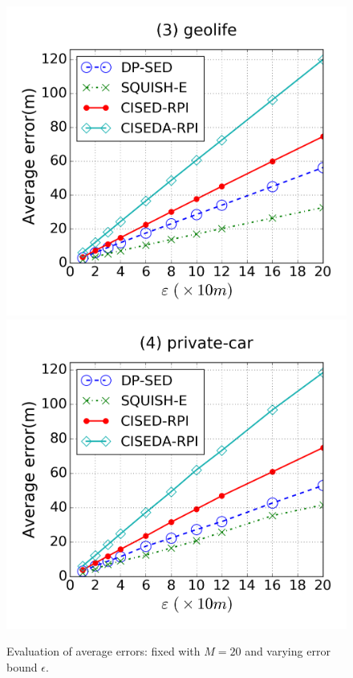 \begin{figure}[tb]
\includegraphics[scale = 0.250]{figures/Exp-error-epsilon-geolife.png}
\includegraphics[scale = 0.250]{figures/Exp-error-epsilon-private.png}
\vspace{-3ex}
\caption{\small Evaluation of average errors: fixed with $M=20$ and varying error bound $\epsilon$.}
\label{fig:ae-m20}
\vspace{-1ex}
\end{figure}



